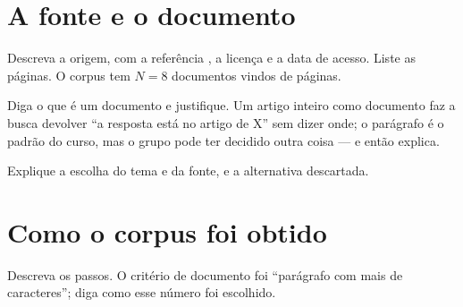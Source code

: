 \documentclass[
  article,
  12pt,
  oneside,
  a4paper,
  english,
  brazil
]{abntex2}\usepackage[]{graphicx}\usepackage[]{xcolor}
\begin{document}
\section{A fonte e o documento}

Descreva a origem, com a referência \cite{wikipedia}, a licença e a data de
acesso. Liste as páginas. O corpus tem $N = \text{8}$ documentos vindos
de  páginas.

Diga o que é um documento e justifique. Um artigo inteiro como documento faz a
busca devolver ``a resposta está no artigo de X'' sem dizer onde; o parágrafo
é o padrão do curso, mas o grupo pode ter decidido outra coisa --- e então
explica.

Explique a escolha do tema e da fonte, e a alternativa descartada.

\section{Como o corpus foi obtido}

Descreva os passos. O critério de documento foi ``parágrafo com mais de
 caracteres''; diga como esse número foi escolhido.
\end{document}

